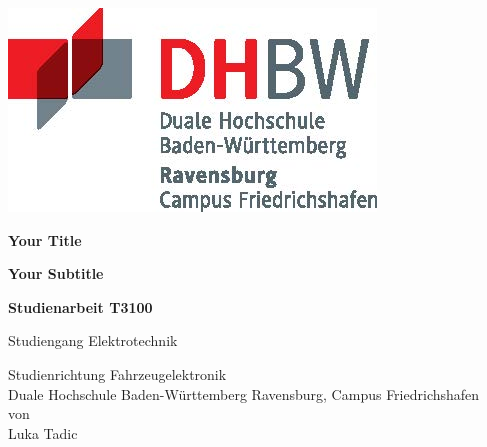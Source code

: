\documentclass{scrbook} %
\newcommand{\titel}{Your Title}
\newcommand{\untertitel}{Your Subtitle}
\newcommand{\arbeit}{Studienarbeit T3100}
\newcommand{\studiengang}{Elektrotechnik}
\newcommand{\studienrichtung}{Fahrzeugelektronik}
\newcommand{\autor}{Luka Tadic}
\begin{document}
\thispagestyle{plain}
\hypersetup{pageanchor=false}

\begin{titlepage}
\enlargethispage{4.0cm}
\sffamily  %

\parbox{0.5\linewidth}{
    \begin{flushleft}
    \end{flushleft}
}
\parbox{0.5\linewidth}{
    \begin{flushright}
        \includegraphics[width=0.4\linewidth]{images/DHBW_d_R_FN_46mm_4c}\\[5ex]
    \end{flushright}
}

\begin{center}

{\fontsize{20.74pt}{24pt}\selectfont
\textbf{\titel}\\[1.5ex]}

{\fontsize{14pt}{17pt}\selectfont
\textbf{\untertitel}\\[5ex]}

{\fontsize{17pt}{20pt}\selectfont
\textbf{\arbeit}\\[2ex]}

{\fontsize{14pt}{17pt}\selectfont
Studiengang \studiengang\\[2ex]}

{\fontsize{12pt}{14pt}\selectfont
Studienrichtung \studienrichtung\\[1ex]
Duale Hochschule Baden-Württemberg Ravensburg, Campus Friedrichshafen\\[5ex]
von\\[1ex]
\autor\\[15ex]}

\end{center}


\end{titlepage}
\end{document}
